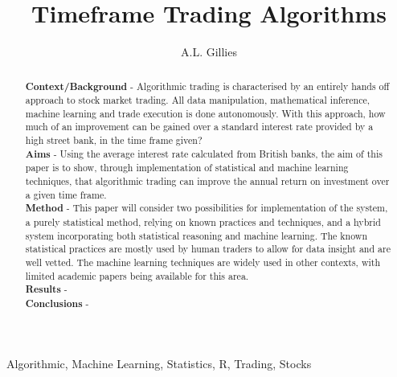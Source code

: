 \documentclass[12pt,a4paper]{article}
\title{Timeframe Trading Algorithms}
\author{A.L. Gillies}
\date{}
\begin{document}
\maketitle

\begin{abstract}
\iffalse
The abstract must be a Structured Abstract with the headings {\bf Context/Background}, {\bf Aims}, {\bf Method}, {\bf Results}, and {\bf Conclusions}.  This section should not be longer than half of a page, and having no more than one or two sentences under each heading is advised.\\
\fi

{\bf Context/Background} - Algorithmic trading is characterised by an entirely hands off approach to stock market trading. All data manipulation, mathematical inference, machine learning and trade execution is done autonomously. With this approach, how much of an improvement can be gained over a standard interest rate provided by a high street bank, in the time frame given?\\

{\bf Aims} - Using the average interest rate calculated from British banks, the aim of this paper is to show, through implementation of statistical and machine learning techniques, that algorithmic trading can improve the annual return on investment over a given time frame.\\

{\bf Method} - This paper will consider two possibilities for implementation of the system, a purely statistical method, relying on known practices and techniques, and a hybrid system incorporating both statistical reasoning and machine learning. The known statistical practices are mostly used by human traders to allow for data insight and are well vetted. The machine learning techniques are widely used in other contexts, with limited academic papers being available for this area.\\

{\bf Results} - \\

{\bf Conclusions} - \\
\end{abstract}

\begin{keywords}
Algorithmic, Machine Learning, Statistics, R, Trading, Stocks
\end{keywords}

\iffalse
#################################################################################
\fi
\end{document}
